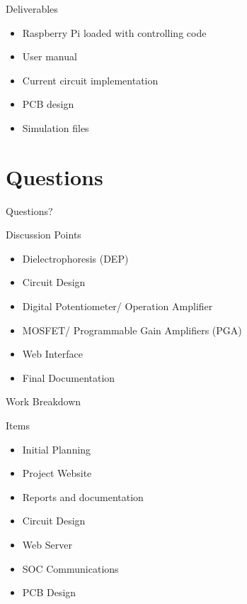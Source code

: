 \begin{frame}{Deliverables}
\begin{block}{} 
  \begin{itemize}
    \item Raspberry Pi loaded with controlling code
    \item User manual
    \item Current circuit implementation
    \item PCB design
    \item Simulation files
  \end{itemize}
\end{block}
\end{frame}

\section{Questions}

\begin{frame}{Questions?}
\begin{block}{Discussion Points}
  \begin{itemize}
    \item Dielectrophoresis (DEP)
    \item Circuit Design
    \item Digital Potentiometer/ Operation Amplifier
    \item MOSFET/ Programmable Gain Amplifiers (PGA)
    \item Web Interface
    \item Final Documentation
  \end{itemize}
\end{block}
\end{frame}

%
%

\begin{frame}{Work Breakdown}
\begin{block}{Items}
  \begin{itemize}
    \item Initial Planning
    \item Project Website
    \item Reports and documentation
    \item Circuit Design
    \item Web Server
    \item SOC Communications
    \item PCB Design
  \end{itemize}
\end{block}
\end{frame}

